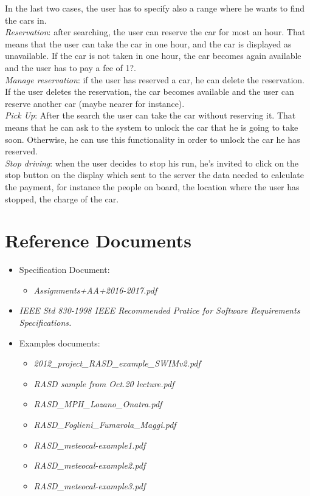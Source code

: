 \documentclass[11pt,a4paper]{report}
\begin{document}
	In the last two cases, the user has to specify also a range where he wants to find the cars in.\\
\textit{Reservation}: after searching, the user can reserve the car for most an hour. That means that the user can take the car in one hour, and the car is displayed as unavailable. If the car is not taken in one hour, the car becomes again available and the user has to pay a fee of 1?. \\
\textit{Manage reservation}: if the user has reserved a car, he can delete the reservation. If the user deletes the reservation, the car becomes available and the user can reserve another car (maybe nearer for instance).\\
\textit{Pick Up}: After the search the user can take the car without reserving it. That means that he can ask to the system to unlock the car that he is going to take soon. Otherwise, he can use this functionality in order to unlock the car he has reserved.\\
\textit{Stop driving}: when the user decides to stop his run, he's invited to click on the stop button on the display which sent to the server the data needed to calculate the payment, for instance the people on board, the location where the user has stopped, the charge of the car.\\

\section{Reference Documents}
	\begin{itemize}
		\item Specification Document:
		\begin{itemize}
			\item \textit{Assignments+AA+2016-2017.pdf}
		\end{itemize}
		\item \textit{IEEE Std 830-1998 IEEE Recommended Pratice for Software Requirements Specifications.}
		\item Examples documents:
		\begin{itemize}
			\item \textit{2012\_project\_RASD\_example\_SWIMv2.pdf}
			\item \textit{RASD sample from Oct.20 lecture.pdf}
			\item \textit{RASD\_MPH\_Lozano\_Onatra.pdf}
			\item \textit{RASD\_Foglieni\_Fumarola\_Maggi.pdf}
			\item \textit{RASD\_meteocal-example1.pdf}
			\item \textit{RASD\_meteocal-example2.pdf}
			\item \textit{RASD\_meteocal-example3.pdf}
		\end{itemize}
	\end{itemize}
\end{document}
